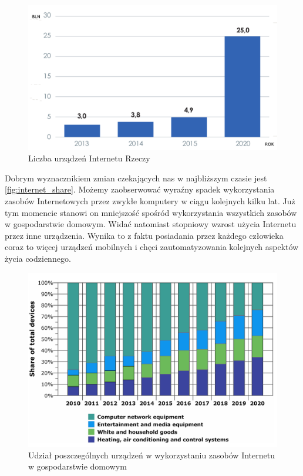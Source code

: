 \begin{figure}[!htbp]
	\centering
	\includegraphics[width=1.0\textwidth]{images/ile_urzadzen.png}
	\caption[Liczba urządzeń Internetu Rzeczy.]{Liczba urządzeń Internetu Rzeczy}
	\label{fig:ile_urzadzen}
\end{figure}

Dobrym wyznacznikiem zmian czekających nas w najbliższym czasie jest \autoref{fig:internet_share}. Możemy zaobserwować wyraźny spadek wykorzystania zasobów Internetowych przez zwykłe komputery w ciągu kolejnych kilku lat. Już tym momencie stanowi on mniejszość spośród wykorzystania wszystkich zasobów w gospodarstwie domowym. Widać natomiast stopniowy wzrost użycia Internetu przez inne urządzenia. Wynika to z faktu posiadania przez każdego człowieka coraz to więcej urządzeń mobilnych i chęci zautomatyzowania kolejnych aspektów życia codziennego. 
\begin{figure}[!htbp]
	\centering
	\includegraphics[width=1.0\textwidth]{images/internet_share.png}
	\caption[Udział poszczególnych urządzeń w wykorzystaniu zasobów Internetu w gospodarstwie domowym.]{Udział poszczególnych urządzeń w wykorzystaniu zasobów Internetu w gospodarstwie domowym}
	\label{fig:internet_share}
\end{figure}


